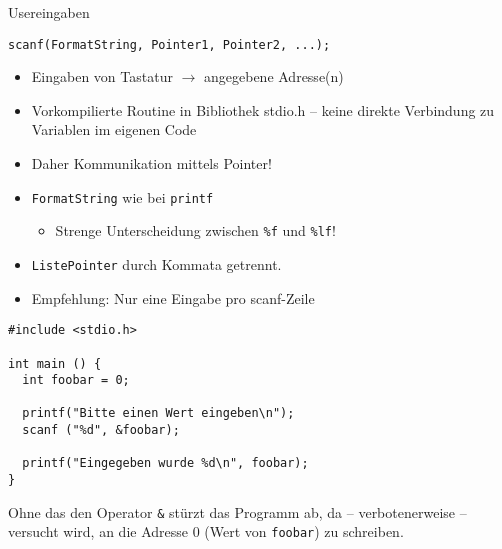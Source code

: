 
\begin{frame}{Usereingaben}
%
\begin{codebox}[Syntax]
\small
\texttt{scanf(FormatString, Pointer1, Pointer2, ...);}
\end{codebox}
\begin{itemize}
\item Eingaben von Tastatur $\rightarrow$ angegebene Adresse(n)
\item Vorkompilierte Routine in Bibliothek stdio.h -- 
	keine direkte Verbindung zu Variablen im eigenen Code
\item Daher Kommunikation mittels Pointer!
\item \texttt{FormatString} wie bei \texttt{printf}
	\begin{itemize}
	\item Strenge Unterscheidung zwischen \texttt{\%f} und \texttt{\%lf}!
	\end{itemize}
\item \texttt{ListePointer} durch Kommata getrennt.
\item Empfehlung: Nur eine Eingabe pro scanf-Zeile
\end{itemize}
%
\end{frame}


\begin{frame}[fragile]%
%
\begin{codebox}
\begin{verbatim}
#include <stdio.h>

int main () {
  int foobar = 0;
  
  printf("Bitte einen Wert eingeben\n");
  scanf ("%d", &foobar);
  
  printf("Eingegeben wurde %d\n", foobar);
}
\end{verbatim}
\end{codebox}
%
\begin{warnbox}
\small Ohne das den Operator \texttt{&} stürzt das Programm ab, da -- verbotenerweise -- versucht wird, an die Adresse 0 (Wert von \texttt{foobar}) zu schreiben.
\end{warnbox}
%
\end{frame}


